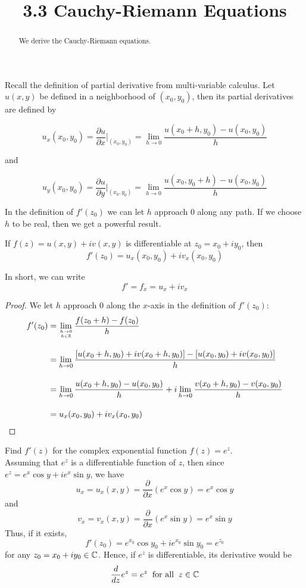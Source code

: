 \documentclass[handout]{ximera}
\title{3.3 Cauchy-Riemann Equations}
\begin{document}
\begin{abstract}
We derive the Cauchy-Riemann equations.
\end{abstract}

\maketitle

Recall the definition of partial derivative from multi-variable calculus.  
Let $u(x,y)$ be defined in a neighborhood of $(x_0,y_0)$, then its partial derivatives are defined by

\[
u_x(x_0, y_0) = \frac{\partial u}{\partial x}\Bigg|_{(x_0,y_0)} = \lim_{h \to 0} \frac{u(x_0 +h, y_0) - u(x_0,y_0)}{h}
\]

and

\[
u_y(x_0, y_0) = \frac{\partial u}{\partial y}\Bigg|_{(x_0,y_0)} = \lim_{h \to 0} \frac{u(x_0 , y_0+h) - u(x_0,y_0)}{h}
\]

In the definition of $f'(z_0)$ we can let $h$ approach $0$ along any path. If we choose $h$ to be real, then we get a powerful result.

\begin{theorem}
If $f(z) = u(x,y) + iv(x,y)$ is differentiable at $z_0 = x_0 + iy_0$, then
\[
f'(z_0) = u_x(x_0,y_0) + iv_x(x_0,y_0)
\]
\end{theorem}

\begin{remark}
In short, we can write
\[
f' = f_x = u_x + iv_x
\]
\end{remark}

\begin{proof}
We let $h$ approach $0$ along the $x$-axis in the definition of $f'(z_0)$:
\begin{align*}
f'(z_0) &= \lim_{h \to 0 \atop h \in \mathbb R} \frac{f(z_0 + h) -f(z_0)}{h} \\[10pt]
        &= \lim_{h \to 0} \frac{\left[u(x_0 +h, y_0) + iv(x_0 +h, y_0)\right] - \left[u(x_0,y_0)+iv(x_0, y_0)\right]}{h} \\[10pt]
        &=  \lim_{h \to 0} \frac{u(x_0 +h, y_0)- u(x_0,y_0)}{h} +i\lim_{h \to 0}\frac{v(x_0 +h, y_0)-v(x_0, y_0)}{h} \\[10pt]
        &= u_x(x_0,y_0) + iv_x(x_0,y_0)
\end{align*}
\end{proof}


\begin{example}
Find $f'(z)$ for the complex exponential function $f(z) = e^z$.\\
Assuming that $e^z$ is a differentiable function of $z$, then since $e^z = e^x \cos y + i e^x \sin y$, we have
\[
u_x = u_x(x,y) = \frac{\partial}{\partial x} \left(e^x \cos y \right)= e^x \cos y 
\]
and
\[
 v_x = v_x(x,y) = \frac{\partial}{\partial x}\left(e^x \sin y\right) = e^x \sin y
\]
Thus, if it exists, 
\[
f'(z_0) = e^{x_0} \cos y_0 + i e^{x_0} \sin y_0  = e^{z_0}
\]
for any $z_0 = x_0 + iy_0 \in \mathbb C$.
Hence, if $e^z$ is differentiable, its derivative would be
\[
\frac{d}{dz} e^z = e^z \;\; \mbox{for all} \;\; z \in \mathbb C
\]
\end{example}
\end{document}
